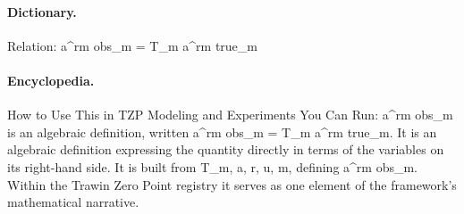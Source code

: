 \paragraph{Dictionary.}
Relation: a\textasciicircum{}rm obs\_m = T\_m a\textasciicircum{}rm true\_m

\paragraph{Encyclopedia.}
How to Use This in TZP Modeling and Experiments You Can Run: a\textasciicircum{}rm obs\_m is an algebraic definition, written a\textasciicircum{}rm obs\_m = T\_m a\textasciicircum{}rm true\_m. It is an algebraic definition expressing the quantity directly in terms of the variables on its right-hand side. It is built from T\_m, a, r, u, m, defining a\textasciicircum{}rm obs\_m. Within the Trawin Zero Point registry it serves as one element of the framework's mathematical narrative.
